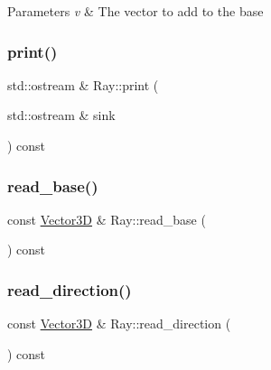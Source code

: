 \begin{DoxyParams}{Parameters}
{\em v} & The vector to add to the base \\
\hline
\end{DoxyParams}
\mbox{\label{classRay_affe30fb07c70905f6934c2baeb8a4c27}} 
\subsubsection{\texorpdfstring{print()}{print()}}
{\footnotesize\ttfamily std\+::ostream \& Ray\+::print (\begin{DoxyParamCaption}\item[{std\+::ostream \&}]{sink }\end{DoxyParamCaption}) const\hspace{0.3cm}{\ttfamily [private]}}

\mbox{\label{classRay_a33eec320d0435f66ec1165fe88356612}} 
\subsubsection{\texorpdfstring{read\_base()}{read\_base()}}
{\footnotesize\ttfamily const \mbox{\hyperlink{classVector3D}{Vector3D}} \& Ray\+::read\+\_\+base (\begin{DoxyParamCaption}{ }\end{DoxyParamCaption}) const}

\mbox{\label{classRay_a3c37bb998b46af694a2055dc58558925}} 
\subsubsection{\texorpdfstring{read\_direction()}{read\_direction()}}
{\footnotesize\ttfamily const \mbox{\hyperlink{classVector3D}{Vector3D}} \& Ray\+::read\+\_\+direction (\begin{DoxyParamCaption}{ }\end{DoxyParamCaption}) const}

\mbox{\label{classRay_a280b269d134e49fd81951c538afd3ce9}} 
